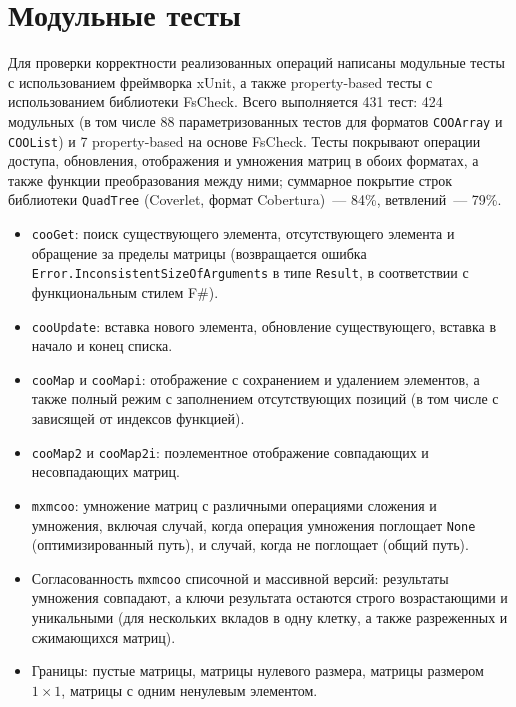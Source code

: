 \documentclass[a4paper]{article}
\begin{document}
\section{Модульные тесты}

Для проверки корректности реализованных операций написаны модульные тесты с использованием фреймворка xUnit, а также property-based тесты с использованием библиотеки FsCheck. Всего выполняется 431 тест: 424 модульных (в том числе 88 параметризованных тестов для форматов \texttt{COOArray} и \texttt{COOList}) и 7 property-based на основе FsCheck. Тесты покрывают операции доступа, обновления, отображения и умножения матриц в обоих форматах, а также функции преобразования между ними; суммарное покрытие строк библиотеки \texttt{QuadTree} (Coverlet, формат Cobertura)~--- 84\%, ветвлений~--- 79\%.

\begin{itemize}
    \item \texttt{cooGet}: поиск существующего элемента, отсутствующего элемента и обращение за пределы матрицы (возвращается ошибка \texttt{Error.InconsistentSizeOfArguments} в типе \texttt{Result}, в соответствии с функциональным стилем F\#).
    \item \texttt{cooUpdate}: вставка нового элемента, обновление существующего, вставка в начало и конец списка.
    \item \texttt{cooMap} и \texttt{cooMapi}: отображение с сохранением и удалением элементов, а также полный режим с заполнением отсутствующих позиций (в том числе с зависящей от индексов функцией).
    \item \texttt{cooMap2} и \texttt{cooMap2i}: поэлементное отображение совпадающих и несовпадающих матриц.
    \item \texttt{mxmcoo}: умножение матриц с различными операциями сложения и умножения, включая случай, когда операция умножения поглощает \texttt{None} (оптимизированный путь), и случай, когда не поглощает (общий путь).
    \item Согласованность \texttt{mxmcoo} списочной и массивной версий: результаты умножения совпадают, а ключи результата остаются строго возрастающими и уникальными (для нескольких вкладов в одну клетку, а также разреженных и сжимающихся матриц).
    \item Границы: пустые матрицы, матрицы нулевого размера, матрицы размером $1 \times 1$, матрицы с одним ненулевым элементом.
\end{itemize}
\end{document}
